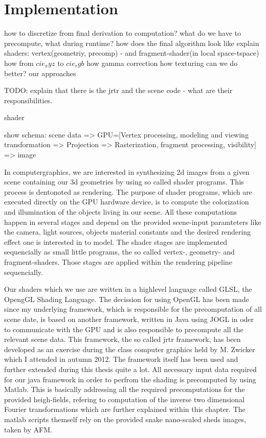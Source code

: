 \section{Implementation}

how to discretize from final derivation to computation?
what do we have to precompute, what during runtime?
how does the final algorithm look like
explain shaders: vertex(geometriy, precomp) - and fragment-shader(in local space-tspace)
how from $cie_xyz$ to $cie_rgb$
how gamma correction
how texturing 
can we do better?
our approaches

TODO: explain that there is the jrtr and the scene code - what are their responsibilities.

shader


show schema: scene data => GPU=[Vertex processing, modeling and viewing transformation => Projection => Rasterization, fragment processing, visibility] => image

In computergraphics, we are interested in synthesizing 2d images from a given scene containing our 3d geometries by using so called shader programs. This process is dentonoted as rendering.
The purpose of shader programs, which are executed directly on the GPU hardware device, is to compute the colorization and illumination of the objects living in our scene. All these computations happen in several stages and depend on the provided scene-input paramteters like the camera, light sources, objects material constants and the desired rendering effect one is interested in to model. The shader stages are implemented sequencially as small little programs, the so called vertex-, geometry- and fragment-shaders. Those stages are applied within the rendering pipeline sequencially. 

Our shaders which we use are written in a highlevel language called GLSL, the OpengGL Shading Language. The decission for using OpenGL has been made since my underlying framework, which is responsible for the precomputation of all scene date, is based on another framework, written in Java using JOGL in oder to communicate with the GPU and is also responsible to precompute all the relevant scene data. This framework, the so called jrtr framework, has been developed as an exercise during the class computer graphics held by M. Zwicker which I attended in autumn 2012. The framework itself has been used and further extended during this thesis quite a lot. All necessary input data required for our java framework in order to perfrom the shading is precomputed by using Matlab. This is basically addressing all the required precomputations for the provided heigh-fields, refering to computation of the inverse two dimensional Fourier transformations which are further explained within this chapter. The matlab scripts themself rely on the provided snake nano-scaled sheds images, taken by AFM.

